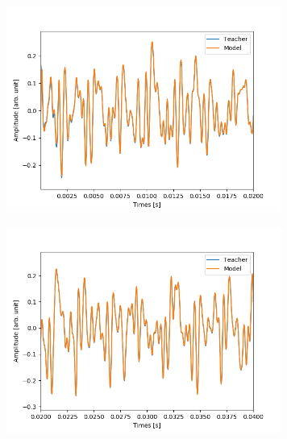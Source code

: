 \documentclass{jreport}		%
\begin{document}
\begin{figure}[htbp]
 \begin{minipage}{0.5\hsize}
 \begin{center}
  \includegraphics[width=90mm]{gain1_output_hikaku.png}
 \end{center}
 \label{fig:one}
 \end{minipage}
 \begin{minipage}{0.5\hsize}
 \begin{center}
  \includegraphics[width=90mm]{gain1_output_hikaku2.png}
 \end{center}
 \label{fig:two}
 \end{minipage}
\end{figure}
\end{document}
